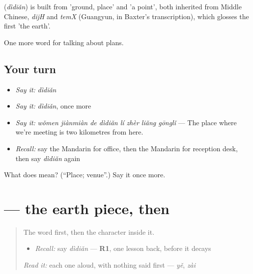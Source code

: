 \begin{cousinweb}
\textbf{} (\emph{dìdiǎn}) is built from  'ground, place' and  'a point', both inherited from Middle Chinese, \emph{dijH} and \emph{temX} (Guangyun, in Baxter's transcription), which glosses the first 'the earth'.
\end{cousinweb}

\begin{grammarlens}[title={What you've built}]
One more word for talking about plans.
\end{grammarlens}

\subsection*{Your turn}
\begin{itemize}
\raggedright
  \item \emph{Say it:} \emph{dìdiǎn}
  \item \emph{Say it:} \emph{dìdiǎn}, once more
  \item \emph{Say it:} \emph{wǒmen jiànmiàn de dìdiǎn lí zhèr liǎng gōnglǐ} — The place where we're meeting is two kilometres from here.
  \item \emph{Recall:} say the Mandarin for office, then the Mandarin for reception desk, then say \emph{dìdiǎn} again
\end{itemize}

\begin{tcolorbox}[breakable,colback=teal!4,colframe=teal!35!black,title={Before you move on}]
What does  mean? (\textquotedblleft{}Place; venue\textquotedblright{}.) Say it once more.
\end{tcolorbox}
\section[\texorpdfstring{\zh{地} (dì)}{地 (dì)}]{ — the earth piece, then }

\label{lesson:ZH-W207-di-ground}



\begin{quote}
The word first, then the character inside it.

\begin{itemize}
\raggedright
  \item \emph{Recall:} say \emph{dìdiǎn} — \textbf{R1}, one lesson back, before it decays
\end{itemize}

\begin{quote}
 
\end{quote}

\emph{Read it:} each one aloud, with nothing said first — \emph{yě}, \emph{zài}
\end{quote}

